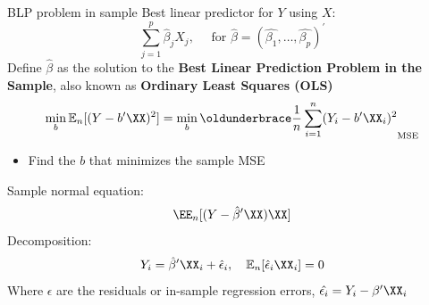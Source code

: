 \documentclass[compress, 8pt]{beamer}
\begin{document}
\begin{frame}{BLP problem in sample}
    Best linear predictor for $Y$ using $X$:
    \begin{equation*}
        \sum_{j=1}^p \hat{\beta}_j X_j, \quad \text{ for } \hat{\beta} = (\hat{\beta_1}, \dots, \hat{\beta_p})^\prime
    \end{equation*}
    \quad
    Define $\hat{\beta}$ as the solution to the \textbf{Best Linear Prediction Problem in the Sample}, also known as \textbf{Ordinary Least Squares (OLS)}
    \begin{equation*}
    \min_b \mathbb{E}_n [(Y - b^\prime \XX)^2] = \min_b \underbrace{\frac{1}{n} \sum_{i=1}^n (Y_i - b^\prime \XX_i)^2}_{\text{MSE}}
    \end{equation*}
    \begin{itemize}
        \item Find the $b$ that minimizes the sample MSE
    \end{itemize}
    Sample normal equation:
    \begin{equation*}
        \EE_n [(Y - \hat{\beta}^\prime \XX) \XX]
    \end{equation*}
    Decomposition:
    \begin{align*}
        Y_i = \hat{\beta}^\prime \XX_i + \hat{\epsilon}_i, \quad \mathbb{E}_n [\hat{\epsilon}_i \XX_i] = 0
    \end{align*}
    Where $\epsilon$ are the residuals or in-sample regression errors, $\hat{\epsilon_i} = Y_i - \beta^\prime \XX_i$
\end{frame}
\end{document}
